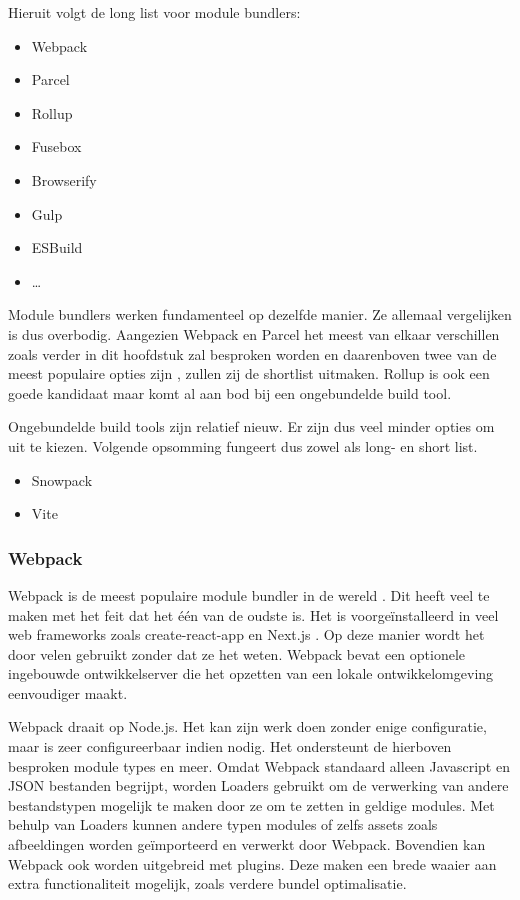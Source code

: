 Hieruit volgt de long list voor module bundlers:
\begin{itemize}
\item Webpack
\item Parcel
\item Rollup
\item Fusebox
\item Browserify
\item Gulp
\item ESBuild
\item …
\end{itemize}

Module bundlers werken fundamenteel op dezelfde manier. Ze allemaal vergelijken is dus overbodig. Aangezien Webpack en Parcel het meest van elkaar verschillen zoals verder in dit hoofdstuk zal besproken worden en daarenboven twee van de meest populaire opties zijn \autocite{stateofjs-2020}, zullen zij de shortlist uitmaken. Rollup is ook een goede kandidaat maar komt al aan bod bij een ongebundelde build tool.

Ongebundelde build tools zijn relatief nieuw. Er zijn dus veel minder opties om uit te kiezen. Volgende opsomming fungeert dus zowel als long- en short list.

\begin{itemize}
\item Snowpack
\item Vite
\end{itemize}

\subsubsection{Webpack}

Webpack is de meest populaire module bundler in de wereld \autocite{stateofjs-2020}. Dit heeft veel te maken met het feit dat het één van de oudste is. Het is voorgeïnstalleerd in veel \gls{web frameworks} zoals create-react-app \autocite{facebook-2021} en Next.js \autocite{vercel-no-date}. Op deze manier wordt het door velen gebruikt zonder dat ze het weten. Webpack bevat een optionele ingebouwde ontwikkelserver die het opzetten van een lokale ontwikkelomgeving eenvoudiger maakt.

Webpack draait op Node.js. Het kan zijn werk doen zonder enige configuratie, maar is zeer configureerbaar indien nodig. Het ondersteunt de hierboven besproken module types en meer. Omdat Webpack standaard alleen \gls{Javascript} en \gls{JSON} bestanden begrijpt, worden Loaders gebruikt om de verwerking van andere bestandstypen mogelijk te maken door ze om te zetten in geldige modules. Met behulp van Loaders kunnen andere typen modules of zelfs assets zoals afbeeldingen worden geïmporteerd en verwerkt door Webpack. Bovendien kan Webpack ook worden uitgebreid met plugins. Deze maken een brede waaier aan extra functionaliteit mogelijk, zoals verdere bundel optimalisatie. 

